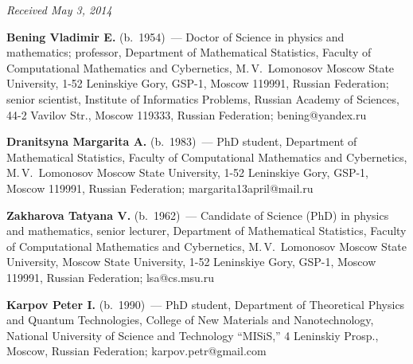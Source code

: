 \vspace*{-6pt}

\hfill{\small\textit{Received May 3, 2014}}

\vspace*{-18pt}




\Contr

\noindent
\textbf{Bening Vladimir E.} (b.\ 1954)~---
Doctor of Science in physics and mathematics; professor, Department of
Mathematical Statistics, Faculty of Computational Mathematics and Cybernetics,
M.\,V.~Lomonosov Moscow State University,
1-52 Leninskiye Gory, GSP-1, Moscow 119991, Russian Federation;
senior scientist, Institute of Informatics Problems, Russian Academy of Sciences,
44-2 Vavilov Str., Moscow 119333, Russian Federation;  bening@yandex.ru

\vspace*{3pt}

\noindent
\textbf{Dranitsyna Margarita A.} (b.\ 1983)~---
PhD student, Department of Mathematical Statistics,
Faculty of Computational Mathematics and Cybernetics, M.\,V.~Lomonosov
Moscow State University,  1-52 Leninskiye Gory, GSP-1, Moscow 119991, Russian Federation;
margarita13april@mail.ru

\vspace*{3pt}

\noindent
\textbf{Zakharova Tatyana V.} (b.\ 1962)~---
Candidate of Science (PhD) in physics and mathematics, senior lecturer,
Department of Mathematical Statistics, Faculty of Computational Mathematics
and Cybernetics, M.\,V.~Lomonosov Moscow State University,
Moscow State University,  1-52 Leninskiye Gory, GSP-1, Moscow 119991,
Russian Federation; lsa@cs.msu.ru

\vspace*{3pt}

\noindent
\textbf{Karpov Peter I.} (b.\ 1990)~---
PhD student, Department of Theoretical Physics and Quantum Technologies,
College of New Materials and Nanotechnology, National University of Science and
Technology ``MISiS,''  4 Leninskiy Prosp., Moscow, Russian Federation;
karpov.petr@gmail.com

 \label{end\stat}

\renewcommand{\bibname}{\protect\rm Литература}